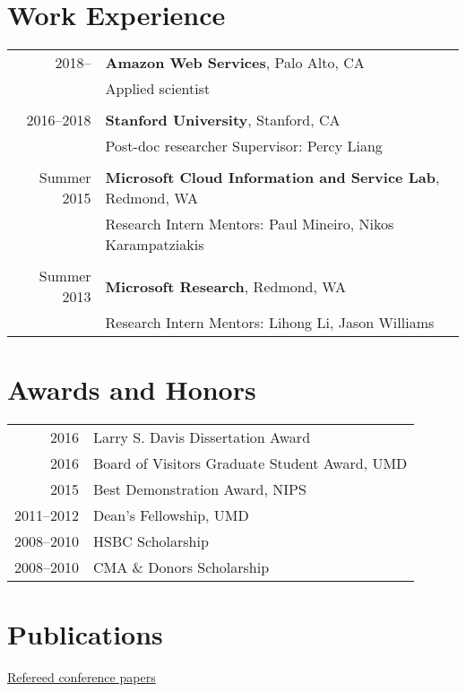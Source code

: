 \documentclass[a4paper,11pt]{article}
\begin{document}
\section{Work Experience}
\begin{tabular}{rl}    
2018--     & \textbf{Amazon Web Services}, Palo Alto, CA \\
    & Applied scientist \\
\\
2016--2018 & \textbf{Stanford University}, Stanford, CA\\
& Post-doc researcher \hspace{2em} Supervisor: Percy Liang \\
\\
Summer 2015 & {\bf Microsoft Cloud Information and Service Lab}, Redmond, WA\\
& Research Intern \hspace{2em} Mentors: Paul Mineiro, Nikos Karampatziakis\\
\\
Summer 2013 & {\bf Microsoft Research}, Redmond, WA\\
& Research Intern \hspace{2em} Mentors: Lihong Li, Jason Williams
\end{tabular}

\section{Awards and Honors}
\begin{tabular}{rl}    
2016 & Larry S. Davis Dissertation Award\\
2016 & Board of Visitors Graduate Student Award, UMD\\
2015 & Best Demonstration Award, NIPS\\
2011--2012 & Dean's Fellowship, UMD \\
2008--2010 & HSBC Scholarship \\
2008--2010 & CMA \& Donors Scholarship\\
\end{tabular}

\section{Publications}
{\underline{Refereed conference papers}}
\end{document}
